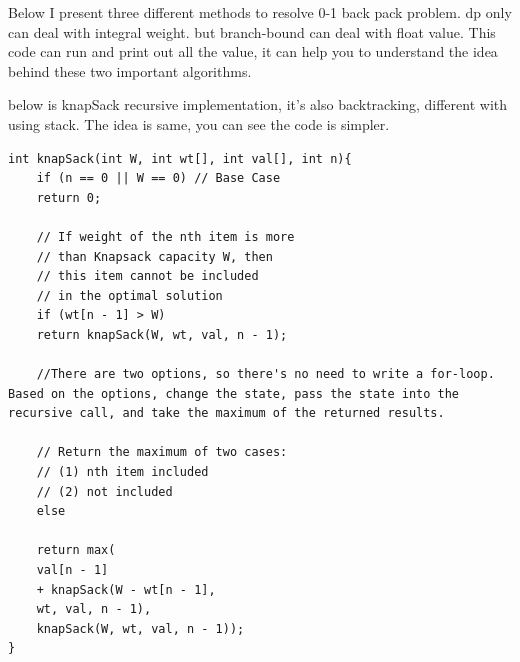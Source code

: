 \documentclass[a4paper,11pt,twoside]{book}
\begin{document}
	\par Below I present three different methods to resolve 0-1 back pack problem. dp only can deal with integral weight. but branch-bound can deal with float value. This code can run and print out all the value, it can help you to understand the idea behind these two important algorithms. 

\par below is knapSack recursive implementation, it's also backtracking, different with using stack. The idea is same, you can see the code is simpler. 
\begin{lstlisting}
int knapSack(int W, int wt[], int val[], int n){
	if (n == 0 || W == 0) // Base Case
	return 0;
	
	// If weight of the nth item is more
	// than Knapsack capacity W, then
	// this item cannot be included
	// in the optimal solution
	if (wt[n - 1] > W)
	return knapSack(W, wt, val, n - 1);
	
	//There are two options, so there's no need to write a for-loop. Based on the options, change the state, pass the state into the recursive call, and take the maximum of the returned results.
	
	// Return the maximum of two cases:
	// (1) nth item included
	// (2) not included
	else
	
	return max(
	val[n - 1]
	+ knapSack(W - wt[n - 1], 
	wt, val, n - 1),
	knapSack(W, wt, val, n - 1));
}			
\end{lstlisting}	
	  
\end{document}

